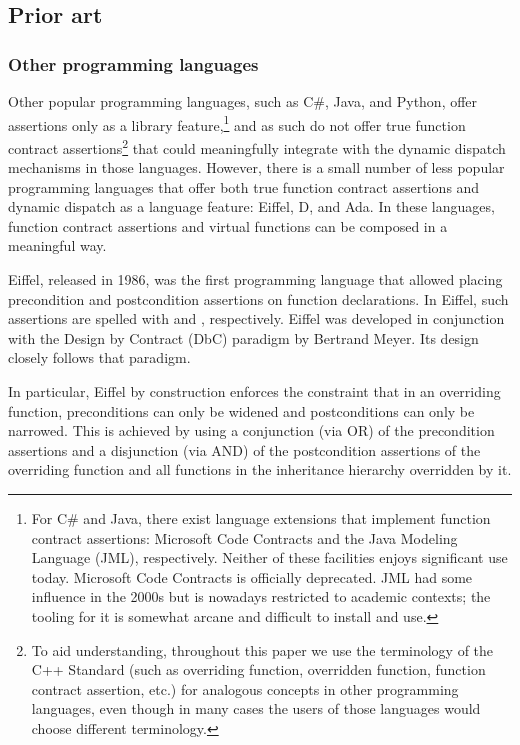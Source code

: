 \subsection{Prior art}

\subsubsection{Other programming languages}

Other popular programming languages, such as C\#, Java, and Python, offer assertions only as a library feature,\footnote{For C\# and Java, there exist language extensions that implement function contract assertions: Microsoft Code Contracts and the Java Modeling Language (JML), respectively. Neither of these facilities enjoys significant use today. Microsoft Code Contracts is officially deprecated. JML had some influence in the 2000s but is nowadays restricted to academic contexts; the tooling for it is somewhat arcane and difficult to install and use.} and as such do not offer true function contract assertions\footnote{To aid understanding, throughout this paper we use the terminology of the C++ Standard (such as overriding function, overridden function, function contract assertion, etc.) for analogous concepts in other programming languages, even though in many cases the users of those languages would choose different terminology.} that could meaningfully integrate with the  dynamic dispatch mechanisms in those languages. However, there is a small number of less popular programming languages that offer both true function contract assertions and dynamic dispatch as a language feature: Eiffel, D, and Ada. In these languages, function contract assertions and virtual functions can be composed in a meaningful way.

Eiffel, released in 1986, was the first programming language that allowed placing precondition and postcondition assertions on function declarations. In Eiffel, such assertions are spelled with  and , respectively. Eiffel was developed in conjunction with the Design by Contract (DbC) paradigm by Bertrand Meyer. Its design closely follows that paradigm.

In particular, Eiffel by construction enforces the constraint that in an overriding function, preconditions can only be widened and postconditions can only be narrowed. This is achieved by using a conjunction (via OR) of the precondition assertions and a disjunction (via AND) of the postcondition assertions of the overriding function and all functions in the inheritance hierarchy overridden by it.

